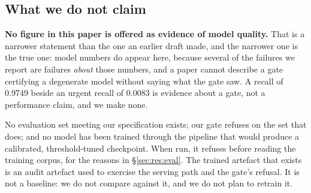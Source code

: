 \subsection{What we do not claim}
\label{sec:res:none}

\textbf{No figure in this paper is offered as evidence of model quality.} That
is a narrower statement than the one an earlier draft made, and the narrower one
is the true one: model numbers do appear here, because several of the failures we
report are failures \emph{about} those numbers, and a paper cannot describe a
gate certifying a degenerate model without saying what the gate saw. A recall of
0.9749 beside an urgent recall of 0.0083 is evidence about a gate, not a
performance claim, and we make none.

No evaluation set meeting our specification exists; our gate refuses on the set
that does; and no model has been trained through the pipeline that would produce
a calibrated, threshold-tuned checkpoint. When run, it refuses before reading
the training corpus, for the reasons in §\ref{sec:res:eval}. The trained artefact
that exists is an audit artefact used to exercise the serving path and the gate's
refusal. It is not a baseline: we do not compare against it, and we do not plan to
retrain it.
